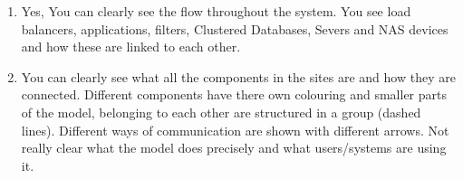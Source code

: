 \begin{enumerate}
	\item Yes, You can clearly see the flow throughout the system.
	You see load balancers, applications, filters, Clustered Databases, Severs and NAS devices and how these are linked to each other.
	
	\item You can clearly see what all the components in the sites are and how they are connected.
	Different components have there own colouring and smaller parts of the model, belonging to each other are structured in a group (dashed lines).
	Different ways of communication are shown with different arrows.
	Not really clear what the model does precisely and what users/systems are using it.
\end{enumerate} 